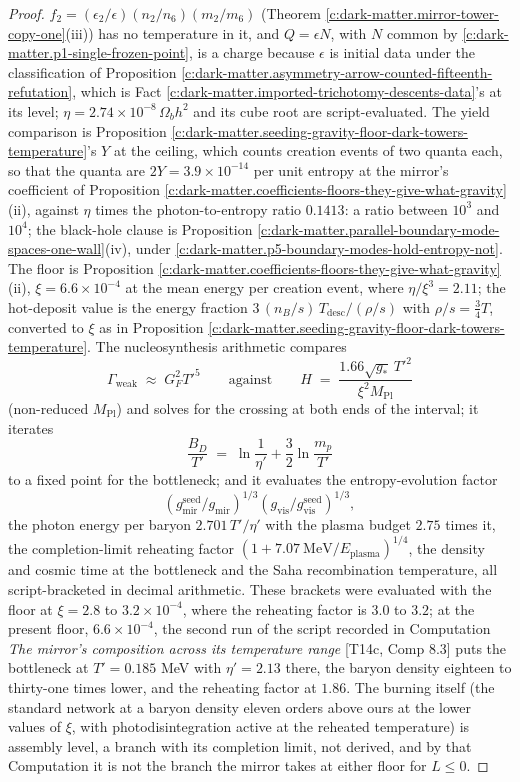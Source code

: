 \documentclass[11pt]{article}
\theoremstyle{definition}
\theoremstyle{plain}
\begin{document}
\begin{proof}
$f_{2} = (\epsilon_{2}/\epsilon)(n_{2}/n_{6})(m_{2}/m_{6})$ (Theorem \ref{c:dark-matter.mirror-tower-copy-one}(iii)) has no temperature in it, and $Q = \epsilon N$, with $N$ common by \ref{c:dark-matter.p1-single-frozen-point}, is a charge because $\epsilon$ is initial data under the classification of Proposition \ref{c:dark-matter.asymmetry-arrow-counted-fifteenth-refutation}, which is Fact \ref{c:dark-matter.imported-trichotomy-descents-data}'s at its level; $\eta = 2.74 \times 10^{-8}\,\Omega_{b}h^{2}$ and its cube root are script-evaluated. The yield comparison is Proposition \ref{c:dark-matter.seeding-gravity-floor-dark-towers-temperature}'s $Y$ at the ceiling, which counts creation events of two quanta each, so that the quanta are $2Y = 3.9 \times 10^{-14}$ per unit entropy at the mirror's coefficient of Proposition \ref{c:dark-matter.coefficients-floors-they-give-what-gravity}(ii), against $\eta$ times the photon-to-entropy ratio $0.1413$: a ratio between $10^{3}$ and $10^{4}$; the black-hole clause is Proposition \ref{c:dark-matter.parallel-boundary-mode-spaces-one-wall}(iv), under \ref{c:dark-matter.p5-boundary-modes-hold-entropy-not}. The floor is Proposition \ref{c:dark-matter.coefficients-floors-they-give-what-gravity}(ii), $\xi = 6.6 \times 10^{-4}$ at the mean energy per creation event, where $\eta/\xi^{3} = 2.11$; the hot-deposit value is the energy fraction $3\,(n_{B}/s)\,T_{\mathrm{desc}}/(\rho/s)$ with $\rho/s = \tfrac{3}{4}T$, converted to $\xi$ as in Proposition \ref{c:dark-matter.seeding-gravity-floor-dark-towers-temperature}. The nucleosynthesis arithmetic compares
\[
\Gamma_{\mathrm{weak}} \;\approx\; G_{F}^{2}T'^{5} \qquad\text{against}\qquad H \;=\; \frac{1.66\sqrt{g_{*}}\,T'^{2}}{\xi^{2}M_{\mathrm{Pl}}}
\]
(non-reduced $M_{\mathrm{Pl}}$) and solves for the crossing at both ends of the interval; it iterates
\[
\frac{B_{D}}{T'} \;=\; \ln\frac{1}{\eta'} + \frac{3}{2}\ln\frac{m_{p}}{T'}
\]
to a fixed point for the bottleneck; and it evaluates the entropy-evolution factor
\[
(g_{\mathrm{mir}}^{\mathrm{seed}}/g_{\mathrm{mir}})^{1/3}(g_{\mathrm{vis}}/g_{\mathrm{vis}}^{\mathrm{seed}})^{1/3},
\]
the photon energy per baryon $2.701\,T'/\eta'$ with the plasma budget $2.75$ times it, the completion-limit reheating factor $(1 + 7.07\ \mathrm{MeV}/E_{\mathrm{plasma}})^{1/4}$, the density and cosmic time at the bottleneck and the Saha recombination temperature, all script-bracketed in decimal arithmetic. These brackets were evaluated with the floor at $\xi = 2.8$ to $3.2 \times 10^{-4}$, where the reheating factor is $3.0$ to $3.2$; at the present floor, $6.6 \times 10^{-4}$, the second run of the script recorded in Computation \emph{The mirror's composition across its temperature range} [T14c, Comp 8.3] puts the bottleneck at $T' = 0.185$ MeV with $\eta' = 2.13$ there, the baryon density eighteen to thirty-one times lower, and the reheating factor at $1.86$. The burning itself (the standard network at a baryon density eleven orders above ours at the lower values of $\xi$, with photodisintegration active at the reheated temperature) is assembly level, a branch with its completion limit, not derived, and by that Computation it is not the branch the mirror takes at either floor for $L \leq 0$.


\end{proof}
\end{document}
